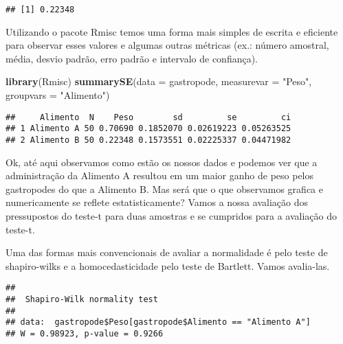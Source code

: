 \documentclass[]{book}
\newenvironment{Shaded}{\begin{snugshade}}{\end{snugshade}}
\newcommand{\DataTypeTok}[1]{\textcolor[rgb]{0.13,0.29,0.53}{#1}}
\newcommand{\KeywordTok}[1]{\textcolor[rgb]{0.13,0.29,0.53}{\textbf{#1}}}
\newcommand{\NormalTok}[1]{#1}
\newcommand{\OperatorTok}[1]{\textcolor[rgb]{0.81,0.36,0.00}{\textbf{#1}}}
\newcommand{\StringTok}[1]{\textcolor[rgb]{0.31,0.60,0.02}{#1}}
\begin{document}
\begin{verbatim}
## [1] 0.22348
\end{verbatim}

Utilizando o pacote Rmisc temos uma forma mais simples de escrita e eficiente para observar esses valores e algumas outras métricas (ex.: número amostral, média, desvio padrão, erro padrão e intervalo de confiança).

\begin{Shaded}
\begin{Highlighting}[]
\KeywordTok{library}\NormalTok{(Rmisc)}
\KeywordTok{summarySE}\NormalTok{(}\DataTypeTok{data =}\NormalTok{ gastropode, }\DataTypeTok{measurevar =} \StringTok{"Peso"}\NormalTok{, }\DataTypeTok{groupvars =} \StringTok{"Alimento"}\NormalTok{)}
\end{Highlighting}
\end{Shaded}

\begin{verbatim}
##     Alimento  N    Peso        sd         se         ci
## 1 Alimento A 50 0.70690 0.1852070 0.02619223 0.05263525
## 2 Alimento B 50 0.22348 0.1573551 0.02225337 0.04471982
\end{verbatim}

Ok, até aqui observamos como estão os nossos dados e podemos ver que a administração da Alimento A resultou em um maior ganho de peso pelos gastropodes do que a Alimento B. Mas será que o que observamos grafica e numericamente se reflete estatisticamente? Vamos a nossa avaliação dos pressupostos do teste-t para duas amostras e se cumpridos para a avaliação do teste-t.

Uma das formas mais convencionais de avaliar a normalidade é pelo teste de shapiro-wilks e a homocedasticidade pelo teste de Bartlett. Vamos avalia-las.

\begin{Shaded}
\end{Shaded}

\begin{verbatim}
## 
##  Shapiro-Wilk normality test
## 
## data:  gastropode$Peso[gastropode$Alimento == "Alimento A"]
## W = 0.98923, p-value = 0.9266
\end{verbatim}
\end{document}
